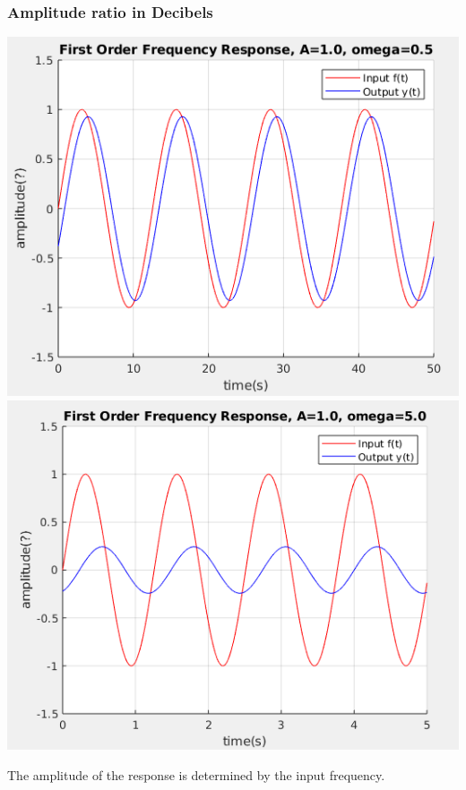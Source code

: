 \documentclass[fleqn]{beamer} %
\newcommand{\sectionIIsubsectionIItitle}{Amplitude ratio in Decibels}
\begin{document}
			\begin{frame}

				\frametitle{\sectionIIsubsectionIItitle}
				\bigskip


				\includegraphics[scale=.275]{images/lecture1_fig6.png} \hspc \includegraphics[scale=.275]{images/lecture1_fig5.png}  \vspc

				The amplitude of the response is determined by the input frequency. \vspc


				\btVFill 
			\end{frame}




\end{document}
